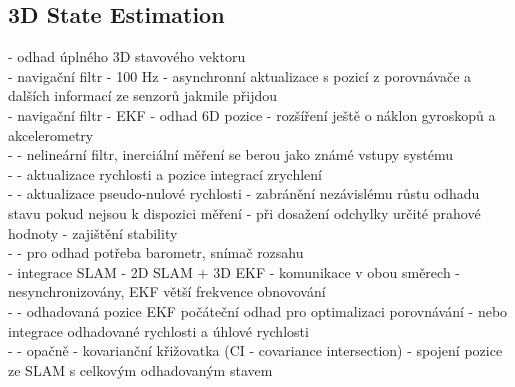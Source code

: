\documentclass[11pt]{article}
\begin{document}
\subsection{3D State Estimation}
- odhad úplného 3D stavového vektoru\\
- navigační filtr - 100 Hz - asynchronní aktualizace s pozicí z porovnávače a dalších informací ze senzorů jakmile přijdou\\
- navigační filtr - EKF - odhad 6D pozice - rozšíření ještě o náklon gyroskopů a akcelerometry\\
- - nelineární filtr, inerciální měření se berou jako známé vstupy systému\\
- - aktualizace rychlosti a pozice integrací zrychlení\\
- - aktualizace pseudo-nulové rychlosti - zabránění nezávislému růstu odhadu stavu pokud nejsou k dispozici měření - při dosažení odchylky určité prahové hodnoty - zajištění stability\\
- - pro odhad potřeba barometr, snímač rozsahu\\
- integrace SLAM - 2D SLAM + 3D EKF - komunikace v obou směrech - nesynchronizovány, EKF větší frekvence obnovování\\
- - odhadovaná pozice EKF počáteční odhad pro optimalizaci porovnávání - nebo integrace odhadované rychlosti a úhlové rychlosti\\
- - opačně - kovarianční křižovatka (CI - covariance intersection) - spojení pozice ze SLAM s celkovým odhadovaným stavem\\
\end{document}
